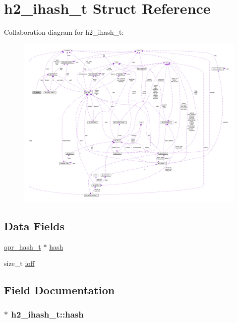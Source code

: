 \hypertarget{structh2__ihash__t}{}\section{h2\+\_\+ihash\+\_\+t Struct Reference}
\label{structh2__ihash__t}


Collaboration diagram for h2\+\_\+ihash\+\_\+t\+:
\nopagebreak
\begin{figure}[H]
\begin{center}
\leavevmode
\includegraphics[width=350pt]{structh2__ihash__t__coll__graph}
\end{center}
\end{figure}
\subsection*{Data Fields}
\begin{DoxyCompactItemize}
\item 
\hyperlink{structapr__hash__t}{apr\+\_\+hash\+\_\+t} $\ast$ \hyperlink{structh2__ihash__t_a547ab0121516e25467b5171a31c00101}{hash}
\item 
size\+\_\+t \hyperlink{structh2__ihash__t_a3acca54a6626295436daa085679863a7}{ioff}
\end{DoxyCompactItemize}


\subsection{Field Documentation}
\subsubsection[{\texorpdfstring{hash}{hash}}]{$\ast$ h2\+\_\+ihash\+\_\+t\+::hash}\hypertarget{structh2__ihash__t_a547ab0121516e25467b5171a31c00101}{}\label{structh2__ihash__t_a547ab0121516e25467b5171a31c00101}
